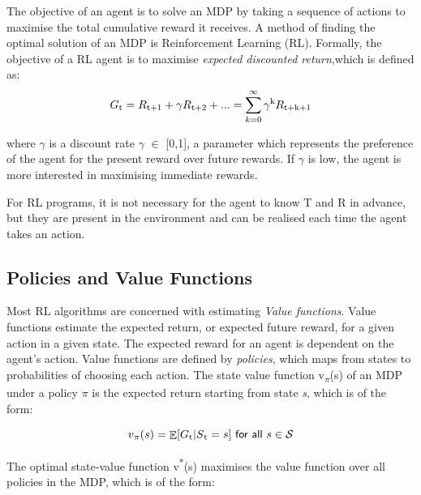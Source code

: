 \documentclass[11pt,twoside]{report}
\theoremstyle{plain}
\theoremstyle{definition}
\DeclareMathOperator{\E}{\mathbb{E}}
\begin{document}

The objective of an agent is to solve an MDP by taking a sequence of actions to maximise the total cumulative reward it receives. 
A method of finding the optimal solution of an MDP is Reinforcement Learning (RL). 
Formally, the objective of a RL agent is to maximise \textit{expected discounted return},which is defined as:
\begin{equation}
\begin{split}
G\textsubscript{t} = R\textsubscript{t+1} + \gamma R \textsubscript{t+2} + ...  = \sum_{k=0}^{\infty} \gamma\textsuperscript{k} R\textsubscript{t+k+1} 
\end{split}
\end{equation}

where $\gamma$ is a discount rate $\gamma$ $\in$ [0,1], a parameter which represents the preference of the agent for the present reward over future rewards. If $\gamma$ is low, the agent is more interested in maximising immediate rewards. 

For RL programs, it is not necessary for the agent to know T and R in advance, but they are present in the environment and can be realised each time the agent takes an action. 

\subsection{Policies and Value Functions}
\label{policy_value_functions_subsection}
Most RL algorithms are concerned with estimating \textit{Value functions}.
Value functions estimate the expected return, or expected future reward,  for a given action in a given state. The expected reward for an agent is dependent on the agent's action.  
Value functions are defined by \textit{policies}, which maps from states to probabilities of choosing each action. The state value function v\textsubscript{$\pi$}(s) of an MDP under a policy $\pi$ is the expected return starting from state \textit{s}, which is of the form:

\begin{equation}
v\textsubscript{$\pi$}(s) = \displaystyle \E [G\textsubscript{t} \vert S\textsubscript{t} = s] \ \textsf{for all}\ s \in \mathcal{S}
\end{equation}

The optimal state-value function v\textsuperscript{*}(s) maximises the value function over all policies in the MDP, which is of the form:
\end{document}
